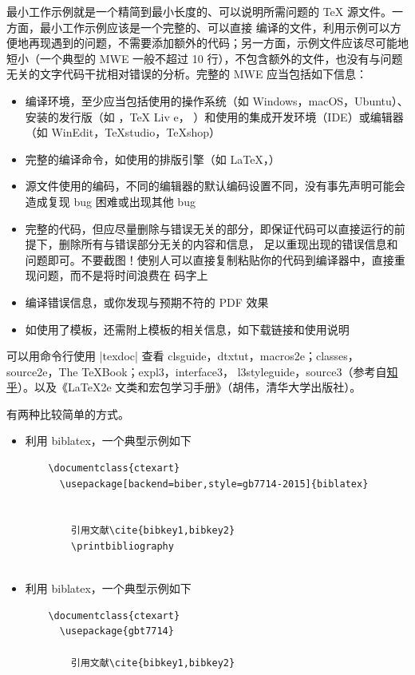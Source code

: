 最小工作示例就是一个精简到最小长度的、可以说明所需问题的 \TeX{} 源文件。一方面，最小工作示例应该是一个完整的、可以直接
编译的文件，利用示例可以方便地再现遇到的问题，不需要添加额外的代码；另一方面，示例文件应该尽可能地短小（一个典型的 MWE 
一般不超过 10 行），不包含额外的文件，也没有与问题无关的文字代码干扰相对错误的分析。完整的 MWE 应当包括如下信息：
\begin{itemize}
  \item 编译环境，至少应当包括使用的操作系统（如 Windows，macOS，Ubuntu）、安装的发行版（如 \CTeX{}，\TeX{} Liv
  e，\MacTeX{} ）和使用的集成开发环境（IDE）或编辑器（如 WinEdit，TeXstudio，TeXshop）
  \item 完整的编译命令，如使用的排版引擎（如 \LaTeX{}，\XeLaTeX{}）
  \item 源文件使用的编码，不同的编辑器的默认编码设置不同，没有事先声明可能会造成复现 bug 困难或出现其他 bug
  \item 完整的代码，但应尽量删除与错误无关的部分，即保证代码可以直接运行的前提下，删除所有与错误部分无关的内容和信息，
  足以重现出现的错误信息和问题即可。不要截图！使别人可以直接复制粘贴你的代码到编译器中，直接重现问题，而不是将时间浪费在
  码字上
  \item 编译错误信息，或你发现与预期不符的 PDF 效果
  \item 如使用了模板，还需附上模板的相关信息，如下载链接和使用说明
\end{itemize}



可以用命令行使用 |texdoc| 查看 clsguide，dtxtut，macros2e；classes，source2e，The TeXBook；expl3，interface3，
l3styleguide，source3（参考自\href{https://www.zhihu.com/question/27017364}{知乎}）。以及《\LaTeX{2e} 
文类和宏包学习手册》（胡伟，清华大学出版社）。









有两种比较简单的方式。
\begin{itemize}
  \item 利用 biblatex，一个典型示例如下
  \begin{verbatim}
    \documentclass{ctexart}
      \usepackage[backend=biber,style=gb7714-2015]{biblatex}
      
      
        引用文献\cite{bibkey1,bibkey2}
        \printbibliography
      
    \end{verbatim}
  \item 利用 biblatex，一个典型示例如下
  \begin{verbatim}
    \documentclass{ctexart}
      \usepackage{gbt7714}
      
        引用文献\cite{bibkey1,bibkey2}
        
      
  \end{verbatim}
\end{itemize}


